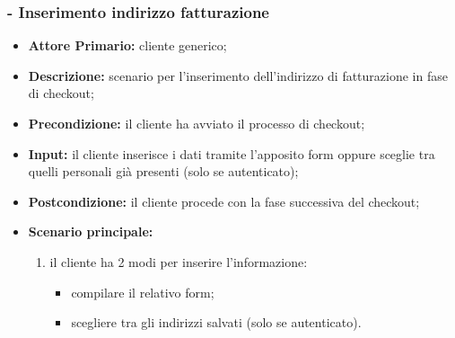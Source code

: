 \subsubsection{ - Inserimento indirizzo fatturazione}
\begin{itemize}
    \item \textbf{Attore Primario:} cliente generico;
    \item \textbf{Descrizione:} scenario per l'inserimento dell'indirizzo di fatturazione in fase di checkout;
    \item \textbf{Precondizione:} il cliente ha avviato il processo di checkout;
    \item \textbf{Input:} il cliente inserisce i dati tramite l'apposito form oppure sceglie tra quelli personali già presenti (solo se autenticato);
    \item \textbf{Postcondizione:} il cliente procede con la fase successiva del checkout;
    \item \textbf{Scenario principale:}
    \begin{enumerate}
        \item il cliente ha 2 modi per inserire l'informazione:
        \begin{itemize}
            \item compilare il relativo form;
            \item scegliere tra gli indirizzi salvati (solo se autenticato).
        \end{itemize}
    \end{enumerate}
\end{itemize}

\stepsubUserCase
